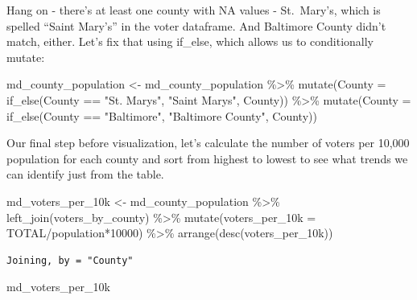 \documentclass[
  letterpaper,
  DIV=11,
  numbers=noendperiod]{scrreprt}
\newenvironment{Shaded}{\begin{snugshade}}{\end{snugshade}}
\newcommand{\AttributeTok}[1]{\textcolor[rgb]{0.40,0.45,0.13}{#1}}
\newcommand{\DecValTok}[1]{\textcolor[rgb]{0.68,0.00,0.00}{#1}}
\newcommand{\FunctionTok}[1]{\textcolor[rgb]{0.28,0.35,0.67}{#1}}
\newcommand{\NormalTok}[1]{\textcolor[rgb]{0.00,0.23,0.31}{#1}}
\newcommand{\OtherTok}[1]{\textcolor[rgb]{0.00,0.23,0.31}{#1}}
\newcommand{\SpecialCharTok}[1]{\textcolor[rgb]{0.37,0.37,0.37}{#1}}
\newcommand{\StringTok}[1]{\textcolor[rgb]{0.13,0.47,0.30}{#1}}
\begin{document}
Hang on - there's at least one county with NA values - St.~Mary's, which
is spelled ``Saint Mary's'' in the voter dataframe. And Baltimore County
didn't match, either. Let's fix that using if\_else, which allows us to
conditionally mutate:

\begin{Shaded}
\begin{Highlighting}[]
\NormalTok{md\_county\_population }\OtherTok{\textless{}{-}}\NormalTok{ md\_county\_population }\SpecialCharTok{\%\textgreater{}\%}
  \FunctionTok{mutate}\NormalTok{(}\AttributeTok{County =} \FunctionTok{if\_else}\NormalTok{(County }\SpecialCharTok{==} \StringTok{"St. Mary\textquotesingle{}s"}\NormalTok{, }\StringTok{"Saint Mary\textquotesingle{}s"}\NormalTok{, County)) }\SpecialCharTok{\%\textgreater{}\%} 
  \FunctionTok{mutate}\NormalTok{(}\AttributeTok{County =} \FunctionTok{if\_else}\NormalTok{(County }\SpecialCharTok{==} \StringTok{"Baltimore"}\NormalTok{, }\StringTok{"Baltimore County"}\NormalTok{, County))}
\end{Highlighting}
\end{Shaded}

Our final step before visualization, let's calculate the number of
voters per 10,000 population for each county and sort from highest to
lowest to see what trends we can identify just from the table.

\begin{Shaded}
\begin{Highlighting}[]
\NormalTok{md\_voters\_per\_10k }\OtherTok{\textless{}{-}}\NormalTok{ md\_county\_population }\SpecialCharTok{\%\textgreater{}\%}
  \FunctionTok{left\_join}\NormalTok{(voters\_by\_county) }\SpecialCharTok{\%\textgreater{}\%}
  \FunctionTok{mutate}\NormalTok{(}\AttributeTok{voters\_per\_10k =}\NormalTok{ TOTAL}\SpecialCharTok{/}\NormalTok{population}\SpecialCharTok{*}\DecValTok{10000}\NormalTok{) }\SpecialCharTok{\%\textgreater{}\%}
  \FunctionTok{arrange}\NormalTok{(}\FunctionTok{desc}\NormalTok{(voters\_per\_10k))}
\end{Highlighting}
\end{Shaded}

\begin{verbatim}
Joining, by = "County"
\end{verbatim}

\begin{Shaded}
\begin{Highlighting}[]
\NormalTok{md\_voters\_per\_10k}
\end{Highlighting}
\end{Shaded}
\end{document}
